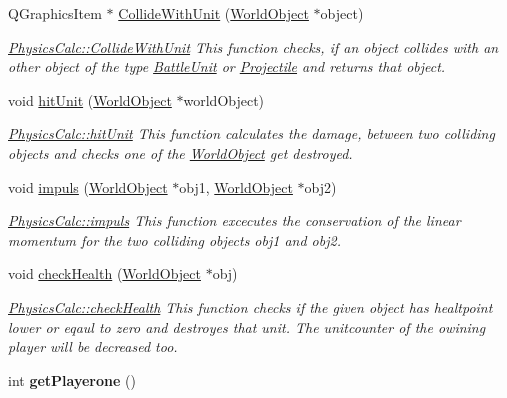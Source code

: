 \begin{DoxyCompactItemize}
\item 
Q\+Graphics\+Item $\ast$ \hyperlink{class_physics_calc_ad6d0e0e75ce2a00c15a883531f454233}{Collide\+With\+Unit} (\hyperlink{class_world_object}{World\+Object} $\ast$object)
\begin{DoxyCompactList}\small\item\em \hyperlink{class_physics_calc_ad6d0e0e75ce2a00c15a883531f454233}{Physics\+Calc\+::\+Collide\+With\+Unit} This function checks, if an object collides with an other object of the type \hyperlink{class_battle_unit}{Battle\+Unit} or \hyperlink{class_projectile}{Projectile} and returns that object. \end{DoxyCompactList}\item 
void \hyperlink{class_physics_calc_a75c4cfbeb112120f4ffd4839182ca25c}{hit\+Unit} (\hyperlink{class_world_object}{World\+Object} $\ast$world\+Object)
\begin{DoxyCompactList}\small\item\em \hyperlink{class_physics_calc_a75c4cfbeb112120f4ffd4839182ca25c}{Physics\+Calc\+::hit\+Unit} This function calculates the damage, between two colliding objects and checks one of the \hyperlink{class_world_object}{World\+Object} get destroyed. \end{DoxyCompactList}\item 
void \hyperlink{class_physics_calc_ad30acc4f9a1111e1d611aa943aff53a3}{impuls} (\hyperlink{class_world_object}{World\+Object} $\ast$obj1, \hyperlink{class_world_object}{World\+Object} $\ast$obj2)
\begin{DoxyCompactList}\small\item\em \hyperlink{class_physics_calc_ad30acc4f9a1111e1d611aa943aff53a3}{Physics\+Calc\+::impuls} This function excecutes the conservation of the linear momentum for the two colliding objects obj1 and obj2. \end{DoxyCompactList}\item 
void \hyperlink{class_physics_calc_aac58c297992ee6fd388ff29c839c5693}{check\+Health} (\hyperlink{class_world_object}{World\+Object} $\ast$obj)
\begin{DoxyCompactList}\small\item\em \hyperlink{class_physics_calc_aac58c297992ee6fd388ff29c839c5693}{Physics\+Calc\+::check\+Health} This function checks if the given object has healtpoint lower or eqaul to zero and destroyes that unit. The unitcounter of the owining player will be decreased too. \end{DoxyCompactList}\item 
int {\bfseries get\+Playerone} ()\hypertarget{class_physics_calc_a2e54d34a8efd8c14c356bdeb5308ad32}{}\label{class_physics_calc_a2e54d34a8efd8c14c356bdeb5308ad32}


\end{DoxyCompactItemize}
